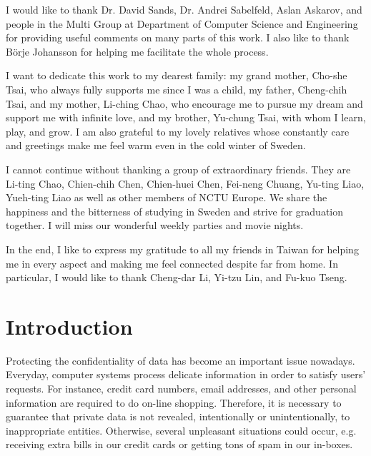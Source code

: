 \documentclass[a4paper]{report}
\begin{document}
I would like to thank Dr. David Sands, Dr. Andrei Sabelfeld, Aslan Askarov, and people in the Multi
Group at Department of Computer Science and Engineering for providing useful comments on many 
parts of this work. I also like to thank B\"{o}rje Johansson for helping me facilitate the 
whole process.

I want to dedicate this work to my dearest family: my grand mother, Cho-she Tsai, who always fully supports
me since I was a child, my father, Cheng-chih Tsai, and my mother, Li-ching Chao, who encourage me
to pursue my dream and support me with infinite love, and my brother, Yu-chung Tsai, with whom I learn, play, 
and grow. I am also grateful to my lovely relatives whose constantly care and greetings make me
feel warm even in the cold winter of Sweden.

I cannot continue without thanking a group of extraordinary friends. They are Li-ting Chao, 
Chien-chih Chen, Chien-huei Chen, Fei-neng Chuang, Yu-ting Liao, Yueh-ting Liao as well as
other members of NCTU Europe. We share the happiness and the bitterness of studying in Sweden and
strive for graduation together. I will miss our wonderful weekly parties and movie nights.

In the end, I like to express my gratitude to all my friends in Taiwan for helping me
in every aspect and making me feel connected despite far from home.
In particular, I would like to thank Cheng-dar Li, Yi-tzu Lin, and Fu-kuo Tseng.


\cleardoublepage
\pagestyle{plain}


\chapter{Introduction}
\label{Chap:Introduction}


Protecting the confidentiality of data has become an important 
issue nowadays. Everyday, computer systems process delicate information in
order to satisfy users' requests. For instance, credit card numbers,
email addresses, and other personal information are required to do on-line
shopping.
Therefore, it is necessary to guarantee that private data is not
revealed, intentionally or unintentionally, to inappropriate entities.
Otherwise, several unpleasant situations could occur, 
e.g. receiving extra bills in our credit
cards or getting tons of spam in our in-boxes. 
 
\end{document}
